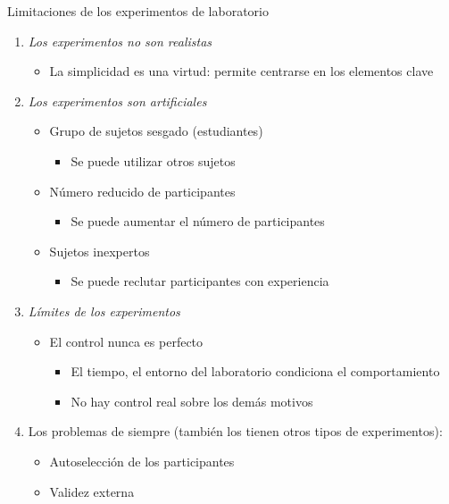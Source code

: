 \documentclass[
  ignorenonframetext,
]{beamer}
\providecommand{\tightlist}{%
  \setlength{\itemsep}{0pt}\setlength{\parskip}{0pt}}
\begin{document}
\begin{frame}{Limitaciones de los experimentos de laboratorio}
\protect\hypertarget{limitaciones-de-los-experimentos-de-laboratorio}{}
\begin{enumerate}
\tightlist
\item
  \textit{Los experimentos no son realistas}

  \begin{itemize}
  \tightlist
  \item
    La simplicidad es una virtud: permite centrarse en los elementos
    clave
  \end{itemize}
\item
  \textit{Los experimentos son artificiales}

  \begin{itemize}
  \tightlist
  \item
    Grupo de sujetos sesgado (estudiantes)

    \begin{itemize}
    \tightlist
    \item
      Se puede utilizar otros sujetos
    \end{itemize}
  \item
    Número reducido de participantes

    \begin{itemize}
    \tightlist
    \item
      Se puede aumentar el número de participantes
    \end{itemize}
  \item
    Sujetos inexpertos

    \begin{itemize}
    \tightlist
    \item
      Se puede reclutar participantes con experiencia
    \end{itemize}
  \end{itemize}
\item
  \textit{Límites de los experimentos}

  \begin{itemize}
  \tightlist
  \item
    El control nunca es perfecto

    \begin{itemize}
    \tightlist
    \item
      El tiempo, el entorno del laboratorio condiciona el comportamiento
    \item
      No hay control real sobre los demás motivos
    \end{itemize}
  \end{itemize}
\item
  Los problemas de siempre (también los tienen otros tipos de
  experimentos):

  \begin{itemize}
  \tightlist
  \item
    Autoselección de los participantes
  \item
    Validez externa
  \end{itemize}
\end{enumerate}
\end{frame}
\end{document}
